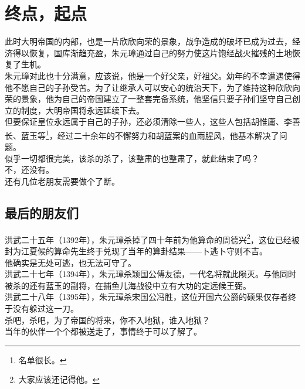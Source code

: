 \section{终点，起点}
\ifnum{}
	\begin{multicols}{\theparacolNo}
\fi
此时大明帝国的内部，也是一片欣欣向荣的景象，战争造成的破坏已成为过去，经济得以恢复，国库渐趋充盈，朱元璋通过自己的努力使这片饱经战火摧残的土地恢复了生机。\\

朱元璋对此也十分满意，应该说，他是一个好父亲，好祖父。幼年的不幸遭遇使得他不愿自己的子孙受苦。为了让继承人可以安心的统治天下，为了维持这种欣欣向荣的景象，他为自己的帝国建立了一整套完备系统，他坚信只要子孙们坚守自己创立的制度，大明帝国将永远延续下去。\\

但要保证皇位永远属于自己的子孙，还必须清除一些人，这些人包括胡惟庸、李善长、蓝玉等\footnote{名单很长。}，经过二十余年的不懈努力和胡蓝案的血雨腥风，他基本解决了问题。\\

似乎一切都很完美，该杀的杀了，该整肃的也整肃了，就此结束了吗？\\

不，还没有。\\

还有几位老朋友需要做个了断。\\

\subsection{最后的朋友们}
洪武二十五年（1392年），朱元璋杀掉了四十年前为他算命的周德兴\footnote{大家应该还记得他。}，这位已经被封为江夏候的算命先生终于兑现了当年的算卦结果——卜逃卜守则不吉。\\

他确实是无处可逃，也无法可守了。\\

洪武二十七年（1394年），朱元璋杀颖国公傅友德，一代名将就此陨灭。与他同时被杀的还有蓝玉的副将，在捕鱼儿海战役中立有大功的定远候王弼。\\

洪武二十八年（1395年），朱元璋杀宋国公冯胜，这位开国六公爵的硕果仅存者终于没有躲过这一刀。\\

杀吧，杀吧，为了帝国的将来，你不入地狱，谁入地狱？\\

当年的伙伴一个个都被送走了，事情终于可以了解了。\\


\end{multicols}
